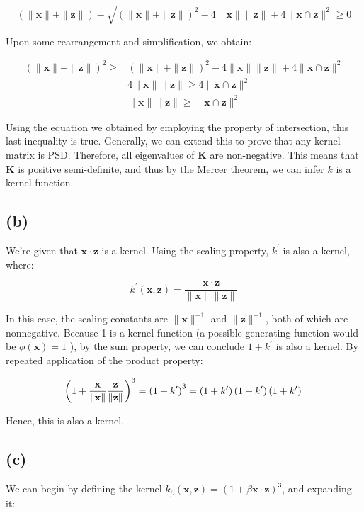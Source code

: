 \documentclass[11pt]{article}
\newcommand{\sol}[1]{{\bf{\color{magenta}{{Solution:}}}}}
\begin{document}
$$
(\|\mathbf{x}\|+\|\mathbf{z}\|)-\sqrt{(\|\mathbf{x}\|+\|\mathbf{z}\|)^{2}-4\|\mathbf{x}\|\|\mathbf{z}\|+4\|\mathbf{x} \cap \mathbf{z}\|^{2}} \geq 0
$$

Upon some rearrangement and simplification, we obtain:

$$
\begin{aligned}
(\|\mathbf{x}\|+\|\mathbf{z}\|)^{2} \geq & (\|\mathbf{x}\|+\|\mathbf{z}\|)^{2}-4\|\mathbf{x}\|\|\mathbf{z}\|+4\|\mathbf{x} \cap \mathbf{z}\|^{2} \\
& 4\|\mathbf{x}\|\|\mathbf{z}\| \geq 4\|\mathbf{x} \cap \mathbf{z}\|^{2} \\
& \|\mathbf{x}\|\|\mathbf{z}\| \geq\|\mathbf{x} \cap \mathbf{z}\|^{2}
\end{aligned}
$$

Using the equation we obtained by employing the property of intersection, this last inequality is true. Generally, we can extend this to prove that any kernel matrix is PSD. Therefore, all eigenvalues of $\mathbf{K}$ are non-negative. This means that $\mathbf{K}$ is positive semi-definite, and thus by the Mercer theorem, we can infer $k$ is a kernel function. 

\subsection{(b)}
\sol x We're given that $\mathbf{x} \cdot \mathbf{z}$ is a kernel. Using the scaling property, $k^{\prime}$ is also a kernel, where:

$$
k^{\prime}(\mathbf{x}, \mathbf{z})=\frac{\mathbf{x} \cdot \mathbf{z}}{\|\mathbf{x}\|\|\mathbf{z}\|}
$$

In this case, the scaling constants are $\|\mathbf{x}\|^{-1}$ and $\|\mathbf{z}\|^{-1}$, both of which are nonnegative. Because 1 is a kernel function (a possible generating function would be $\phi(\mathbf{x})=1$ ), by the sum property, we can conclude $1+k^{\prime}$ is also a kernel. By repeated application of the product property:

$$
\left(1+\frac{\mathbf{x}}{\|\mathbf{x}\|} \frac{\mathbf{z}}{\|\mathbf{z}\|}\right)^{3}=\left(1+k^{\prime}\right)^{3}=\left(1+k^{\prime}\right)\left(1+k^{\prime}\right)\left(1+k^{\prime}\right) \\
$$

Hence, this is also a kernel.

\subsection{(c)}
\sol x We can begin by defining the kernel $k_{\beta}(\mathbf{x}, \mathbf{z})=(1+\beta \mathbf{x} \cdot \mathbf{z})^{3}$, and expanding it:
\end{document}
